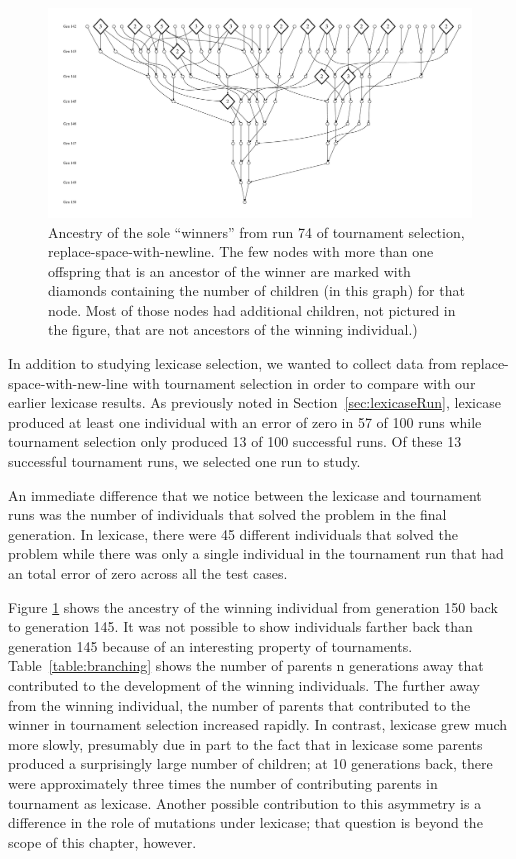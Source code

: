 \begin{figure}
	\vspace{0.6\columnwidth}
	\includegraphics[width=\columnwidth]{figures/ancestors_of_winner_rswn_tourney_run74_9gens.pdf}
	\caption{Ancestry of the sole ``winners'' from run 74 of tournament selection, 
		replace-space-with-newline. The few nodes with more than one offspring that is an ancestor of the winner
		are marked with diamonds containing the number of children (in this graph) for that node. Most of those
		nodes had additional children, not pictured in the figure, that are not ancestors of the winning individual.)}
	\label{fig:winnerAncestorsTourneyRun74}
\end{figure}

In addition to studying lexicase selection, we wanted to collect data from replace-space-with-new-line 
with tournament selection in order to compare with our earlier lexicase results. As previously noted in 
Section~\ref{sec:lexicaseRun}, lexicase  produced at least one individual with an error of zero in 
57 of 100 runs while tournament selection only produced 13 of 100 successful runs. Of these 13 
successful tournament runs, we selected one run to study.

An immediate difference that we notice between the lexicase and tournament runs was the number of 
individuals that solved the problem in the final generation. In lexicase, there were 45 different 
individuals that solved the problem while there was only a single individual in the tournament 
run that had an total error of zero across all the test cases.

Figure \ref{fig:winnerAncestorsTourneyRun74} shows the ancestry of the winning individual from 
generation 150 back to generation 145. It was not possible to show individuals farther back than 
generation 145 because of an interesting property of tournaments. Table~\ref{table:branching} shows 
the number of parents n generations away that contributed to the development of the winning individuals. 
The further away from the winning individual, the number of parents that contributed to the winner 
in tournament selection increased rapidly. In contrast, lexicase grew much more slowly, presumably 
due in part to the fact that in lexicase some parents produced a surprisingly large number of children; 
at 10 generations back, there were approximately three times the number of contributing parents in 
tournament as lexicase. Another possible contribution to this asymmetry is a difference in the role of
mutations under lexicase; that question is beyond the scope of this chapter, however.

